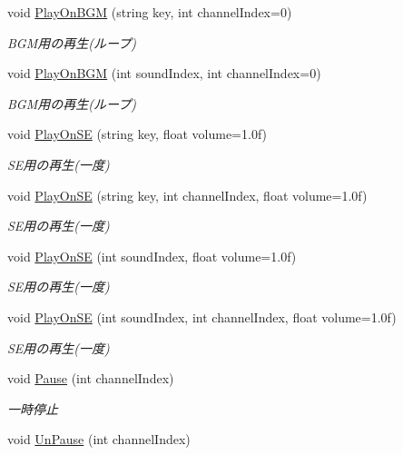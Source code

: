 \begin{DoxyCompactItemize}
void \hyperlink{class_sound_manager_ae07fcf059f70d28547743aa58be78381}{Play\+On\+B\+GM} (string key, int channel\+Index=0)
\begin{DoxyCompactList}\small\item\em B\+G\+M用の再生(ループ) \end{DoxyCompactList}\item 
void \hyperlink{class_sound_manager_a5f049a14d661802e4ccd32bbf44c03c2}{Play\+On\+B\+GM} (int sound\+Index, int channel\+Index=0)
\begin{DoxyCompactList}\small\item\em B\+G\+M用の再生(ループ) \end{DoxyCompactList}\item 
void \hyperlink{class_sound_manager_a77140d592dfb496cf7def31f7880f9ea}{Play\+On\+SE} (string key, float volume=1.\+0f)
\begin{DoxyCompactList}\small\item\em S\+E用の再生(一度) \end{DoxyCompactList}\item 
void \hyperlink{class_sound_manager_a730961318ec947dfbd2a0a4dd8cb9642}{Play\+On\+SE} (string key, int channel\+Index, float volume=1.\+0f)
\begin{DoxyCompactList}\small\item\em S\+E用の再生(一度) \end{DoxyCompactList}\item 
void \hyperlink{class_sound_manager_ae61ef29d24c0df5478fced7a2c2b8998}{Play\+On\+SE} (int sound\+Index, float volume=1.\+0f)
\begin{DoxyCompactList}\small\item\em S\+E用の再生(一度) \end{DoxyCompactList}\item 
void \hyperlink{class_sound_manager_ab91718ea6321db485010e776438bc8d6}{Play\+On\+SE} (int sound\+Index, int channel\+Index, float volume=1.\+0f)
\begin{DoxyCompactList}\small\item\em S\+E用の再生(一度) \end{DoxyCompactList}\item 
void \hyperlink{class_sound_manager_a9dba56ed360cd252930b9f20539244cd}{Pause} (int channel\+Index)
\begin{DoxyCompactList}\small\item\em 一時停止 \end{DoxyCompactList}\item 
void \hyperlink{class_sound_manager_ab25efe5f76915409d0cccef8dfa93464}{Un\+Pause} (int channel\+Index)

\end{DoxyCompactItemize}
